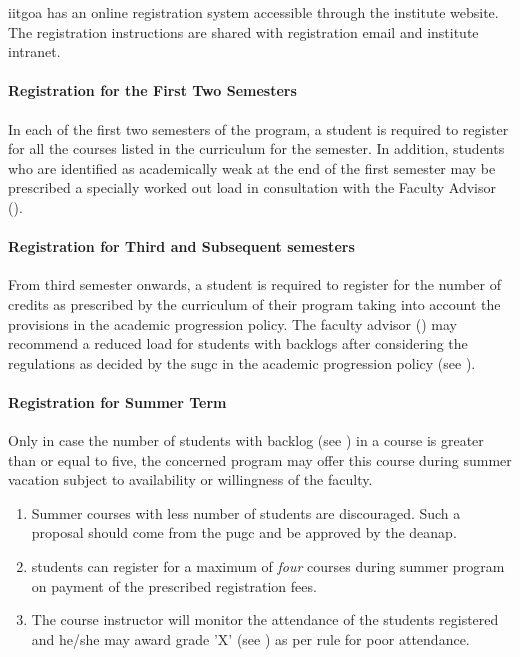\acrshort{iitgoa} has an online registration system accessible through the \gls{institute} website. The registration instructions are shared with registration email and \gls{institute} intranet.

\paragraph{Registration for the First Two Semesters \label{lab:First Year Registration}}

In each of the first two semesters of the program, a student is required to register for all the courses listed in the curriculum for the semester. In addition, students who are identified as academically weak at the end of the first semester may be prescribed a specially worked out load in consultation with the Faculty Advisor ().

\paragraph{Registration for Third and Subsequent semesters}

From third semester onwards, a student is required to register for the number of credits as prescribed by the curriculum of their program taking into account the provisions in the academic progression policy. The faculty advisor () may recommend a reduced load for \glspl{student} with backlogs after considering the regulations as decided by the \acrshort{sugc} in the academic progression policy (see ).

\paragraph{Registration for Summer Term} Only in case the number of \glspl{student} with backlog (see ) in a course is greater than or equal to five, the concerned program may offer this course during summer vacation subject to availability or willingness of the \gls{faculty}.

\begin{enumerate}[leftmargin=15mm]
    \item Summer courses with less number of \glspl{student} are discouraged. Such a proposal should come from the \acrshort{pugc} and be approved by the \acrshort{deanap}.
    \item \Glspl{student} can register for a maximum of \textit{four} courses during summer program on payment of the prescribed registration fees.
    \item The course instructor will monitor the attendance of the \glspl{student} registered and he/she may award grade 'X' (see ) as per rule for poor attendance.
\end{enumerate}

